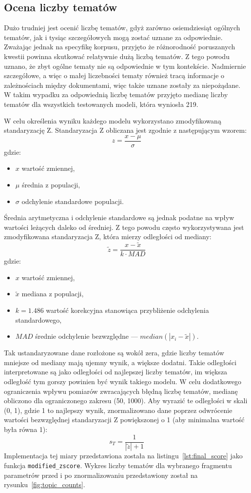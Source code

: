 	\subsection{Ocena liczby tematów}
		Dużo trudniej jest ocenić liczbę tematów, gdyż zarówno osiemdziesiąt ogólnych tematów,
			jak i tysiąc szczegółowych mogą zostać uznane za odpowiednie.
		Zważając jednak na specyfikę korpusu, przyjęto że różnorodność poruszanych kwestii powinna skutkować relatywnie dużą liczbą tematów.
		Z tego powodu uznano, że zbyt ogólne tematy nie są odpowiednie w tym kontekście.
		Nadmiernie szczegółowe, a więc o małej liczebności tematy również tracą informacje o zależnościach między dokumentami,
			więc także uznane zostały za niepożądane.
		W takim wypadku za odpowiednią liczbę tematów przyjęto medianę liczby tematów dla wszystkich testowanych modeli, która wyniosła 219.

		W celu określenia wyniku każdego modelu wykorzystano zmodyfikowaną standaryzację Z.
		Standaryzacja Z obliczana jest zgodnie z następującym wzorem:
		\[z=\frac{x-\mu}{\sigma}\]
		gdzie:
		\begin{itemize}
			\item \(x\) wartość zmiennej,
			\item \(\mu\) średnia z populacji,
			\item \(\sigma\) odchylenie standardowe populacji.
		\end{itemize}
		
		Średnia arytmetyczna i odchylenie standardowe są jednak podatne na wpływ wartości leżących daleko od średniej.
		Z tego powodu często wykorzystywana jest zmodyfikowana standaryzacja Z, która mierzy odległości od mediany:
		\[\tilde{z}=\frac{x-\tilde{x}}{k\cdot MAD}\]
		gdzie:
		\begin{itemize}
			\item \(x\) wartość zmiennej,
			\item \(\tilde{x}\) mediana z populacji,
			\item \(k=1.486\) wartość korekcyjna stanowiąca przybliżenie odchylenia standardowego,
			\item \(MAD\) średnie odchylenie bezwzględne --- \(median\left(|x_i-\tilde{x}|\right)\).
		\end{itemize}

		Tak ustandaryzowane dane rozłożone są wokół zera, gdzie liczby tematów mniejsze od mediany mają ujemny wynik, a większe dodatni.
		Takie odległości interpretowane są jako odległości od najlepszej liczby tematów,
			im większa odległość tym gorszy powinien być wynik takiego modelu.
		W celu dodatkowego ograniczenia wpływu pomiarów zwracających błędną liczbę tematów, medianę obliczono dla ograniczonego zakresu (50, 1000).
		Aby wyrazić te odległości w skali (0, 1), gdzie 1 to najlepszy wynik, znormalizowano dane
			poprzez odwrócenie wartości bezwzględnej standaryzacji Z powiększonej o 1 (aby minimalna wartość była równa 1):
		\[s_T=\frac{1}{|\tilde{z}|+1}\]
		Implementacja tej miary przedstawiona została na listingu~\ref{lst:final_score} jako funkcja \verb|modified_zscore|.
		Wykres liczby tematów dla wybranego fragmentu parametrów przed i po znormalizowaniu przedstawiony został na rysunku~\ref{fig:topic_counts}.

